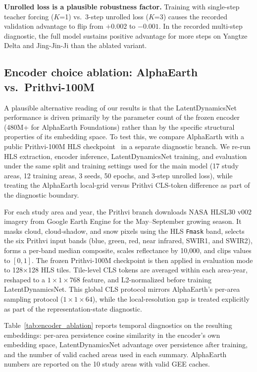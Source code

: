 \documentclass{article}
\begin{document}
\textbf{Unrolled loss is a plausible robustness factor.} Training with single-step teacher forcing ($K$=1) vs.\ 3-step unrolled loss ($K$=3) causes the recorded validation advantage to flip from $+0.002$ to $-0.001$. In the recorded multi-step diagnostic, the full model sustains positive advantage for more steps on Yangtze Delta and Jing-Jin-Ji than the ablated variant.

\subsection{Encoder choice ablation: AlphaEarth vs.\ Prithvi-100M}
\label{sec:encoder_ablation}

A plausible alternative reading of our results is that the LatentDynamicsNet performance is driven primarily by the parameter count of the frozen encoder (480M+ for AlphaEarth Foundations) rather than by the specific structural properties of its embedding space. To test this, we compare AlphaEarth with a public Prithvi-100M HLS checkpoint~\citep{jakubik2024prithvi} in a separate diagnostic branch. We re-run HLS extraction, encoder inference, LatentDynamicsNet training, and evaluation under the same split and training settings used for the main model (17 study areas, 12 training areas, 3 seeds, 50 epochs, and 3-step unrolled loss), while treating the AlphaEarth local-grid versus Prithvi CLS-token difference as part of the diagnostic boundary.

For each study area and year, the Prithvi branch downloads NASA HLSL30 v002 imagery from Google Earth Engine for the May--September growing season. It masks cloud, cloud-shadow, and snow pixels using the HLS \texttt{Fmask} band, selects the six Prithvi input bands (blue, green, red, near infrared, SWIR1, and SWIR2), forms a per-band median composite, scales reflectance by 10{,}000, and clips values to $[0,1]$. The frozen Prithvi-100M checkpoint is then applied in evaluation mode to 128$\times$128 HLS tiles. Tile-level CLS tokens are averaged within each area-year, reshaped to a $1 \times 1 \times 768$ feature, and L2-normalized before training LatentDynamicsNet. This global CLS protocol mirrors AlphaEarth's per-area sampling protocol ($1 \times 1 \times 64$), while the local-resolution gap is treated explicitly as part of the representation-state diagnostic.

Table~\ref{tab:encoder_ablation} reports temporal diagnostics on the resulting embeddings: per-area persistence cosine similarity in the encoder's own embedding space, LatentDynamicsNet advantage over persistence after training, and the number of valid cached areas used in each summary. AlphaEarth numbers are reported on the 10 study areas with valid GEE caches.
\end{document}
